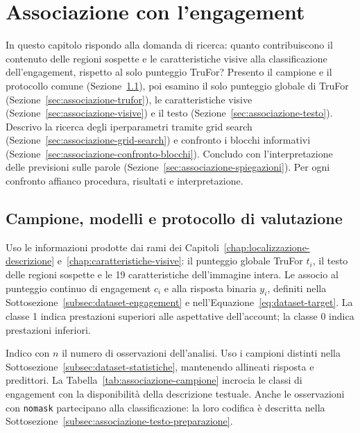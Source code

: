 
\chapter{Associazione con l'engagement}
\label{chap:associazione-engagement}

In questo capitolo rispondo alla domanda di ricerca: quanto contribuiscono il contenuto delle regioni sospette e le caratteristiche visive alla classificazione dell'engagement, rispetto al solo punteggio TruFor? Presento il campione e il protocollo comune (Sezione~\ref{sec:associazione-impostazione}), poi esamino il solo punteggio globale di TruFor (Sezione~\ref{sec:associazione-trufor}), le caratteristiche visive (Sezione~\ref{sec:associazione-visive}) e il testo (Sezione~\ref{sec:associazione-testo}). Descrivo la ricerca degli iperparametri tramite grid search (Sezione~\ref{sec:associazione-grid-search}) e confronto i blocchi informativi (Sezione~\ref{sec:associazione-confronto-blocchi}). Concludo con l'interpretazione delle previsioni sulle parole (Sezione~\ref{sec:associazione-spiegazioni}). Per ogni confronto affianco procedura, risultati e interpretazione.

\section{Campione, modelli e protocollo di valutazione}
\label{sec:associazione-impostazione}

Uso le informazioni prodotte dai rami dei Capitoli~\ref{chap:localizzazione-descrizione} e~\ref{chap:caratteristiche-visive}: il punteggio globale TruFor $t_i$, il testo delle regioni sospette e le 19 caratteristiche dell'immagine intera. Le associo al punteggio continuo di engagement $c_i$ e alla risposta binaria $y_i$, definiti nella Sottosezione~\ref{subsec:dataset-engagement} e nell'Equazione~\ref{eq:dataset-target}. La classe 1 indica prestazioni superiori alle aspettative dell'account; la classe 0 indica prestazioni inferiori.

Indico con $n$ il numero di osservazioni dell'analisi. Uso i campioni distinti nella Sottosezione~\ref{subsec:dataset-statistiche}, mantenendo allineati risposta e predittori. La Tabella~\ref{tab:associazione-campione} incrocia le classi di engagement con la disponibilità della descrizione testuale. Anche le osservazioni con \texttt{nomask} partecipano alla classificazione: la loro codifica è descritta nella Sottosezione~\ref{subsec:associazione-testo-preparazione}.

